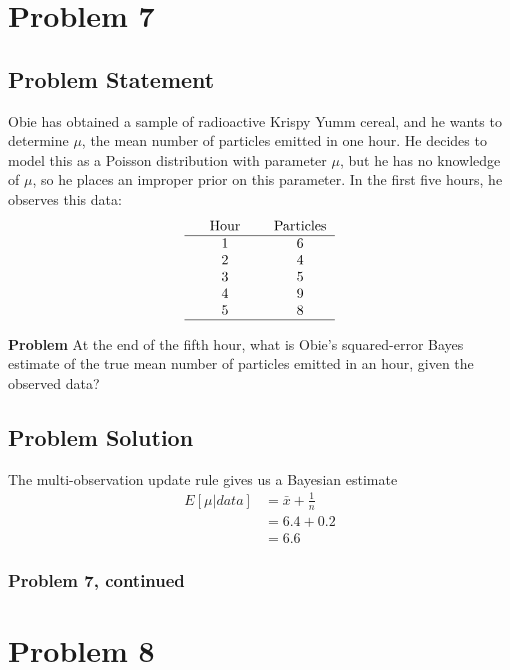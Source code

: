 \documentclass[12pt]{article}
\theoremstyle{definition}
\begin{document}
\newpage
\section*{Problem 7}

\subsection*{Problem Statement}

Obie has obtained a sample of radioactive Krispy Yumm cereal, and he wants to determine $\mu$, the mean number of particles emitted in one hour. He decides to model this as a Poisson distribution with parameter $\mu$, but he has no knowledge of $\mu$, so he places an improper prior on this parameter. In the first five hours, he observes this data:
$$
\begin{tabular}{ccccc}
& Hour & & Particles\\
\hline
& 1 & & 6\\
& 2 & & 4\\
& 3 & & 5\\
& 4 & & 9\\
& 5 & & 8\\
\hline
\end{tabular}
$$

\bigskip
\noindent
{\bf Problem} At the end of the fifth hour, what is Obie's squared-error Bayes estimate of the true mean number of particles emitted in an hour, given the observed data?


\subsection*{Problem Solution}
The multi-observation update rule gives us a Bayesian estimate
\begin{align*}
E[\mu|data] &= \bar{x} + \frac{1}{n}\\
&= 6.4 + 0.2\\
&= 6.6
\end{align*}

\newpage
\subsubsection*{Problem 7, continued}




\newpage
\section*{Problem 8}
\end{document}
